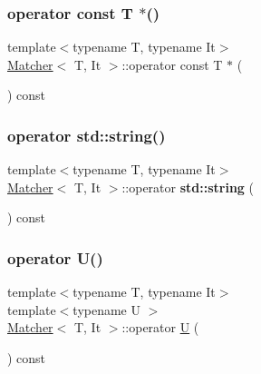 \mbox{\label{class_matcher_ae3f74b07e355126855e40db722c7a51d}} 
\subsubsection{\texorpdfstring{operator const T $\ast$()}{operator const T *()}}
{\footnotesize\ttfamily template$<$typename T, typename It$>$ \\
\hyperlink{class_matcher}{Matcher}$<$ T, It $>$\+::operator const T $\ast$ (\begin{DoxyParamCaption}{ }\end{DoxyParamCaption}) const\hspace{0.3cm}{\ttfamily [inline]}}

\mbox{\label{class_matcher_adc54a96fcfc40186d82a91baeb09211c}} 
\subsubsection{\texorpdfstring{operator std\+::string()}{operator std::string()}}
{\footnotesize\ttfamily template$<$typename T, typename It$>$ \\
\hyperlink{class_matcher}{Matcher}$<$ T, It $>$\+::operator \textbf{ std\+::string} (\begin{DoxyParamCaption}{ }\end{DoxyParamCaption}) const\hspace{0.3cm}{\ttfamily [inline]}}

\mbox{\label{class_matcher_a0bd21eb19304624235c6cb208fa1216a}} 
\subsubsection{\texorpdfstring{operator U()}{operator U()}}
{\footnotesize\ttfamily template$<$typename T, typename It$>$ \\
template$<$typename U $>$ \\
\hyperlink{class_matcher}{Matcher}$<$ T, It $>$\+::operator \hyperlink{union_u}{U} (\begin{DoxyParamCaption}{ }\end{DoxyParamCaption}) const\hspace{0.3cm}{\ttfamily [inline]}}

